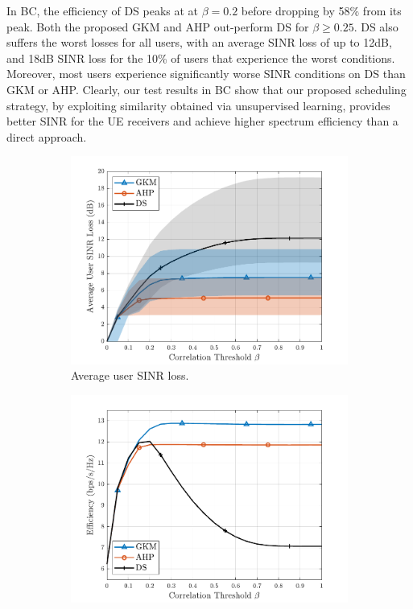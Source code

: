 In BC, the efficiency of DS peaks at at $\beta=0.2$ before dropping by 58\% from its peak.
Both the proposed GKM and AHP out-perform DS for $\beta\geq 0.25$. 
DS also suffers the worst losses for all users, with an average SINR loss of up to 12dB, and 18dB SINR loss for the 10\% of users that experience the worst conditions. Moreover, most users experience significantly worse SINR conditions on DS than GKM or AHP. 
Clearly, our test results in BC show that our proposed scheduling strategy, by exploiting similarity obtained via unsupervised learning, provides better SINR for the UE receivers and achieve higher spectrum efficiency than a direct approach.
\begin{figure}[ht]
	\centering
	\begin{subfigure}{0.48\linewidth}
		\centering
		\includegraphics[width=.95\linewidth]{./figs/usch_figs/BCP_AvgUserSINRLoss_normalizedChannelPwr_M8_N800_nSim10_nChannel100_K04_sigman2_-20.pdf}
		\caption{Average user SINR loss.}\label{usch:fig:BCP_sinrLoss_M8_N800}
	\end{subfigure}
	\begin{subfigure}{0.48\linewidth}
		\centering
		\includegraphics[width=.95\linewidth]{./figs/usch_figs/BCP_NormalizedEfficiency_normalizedChannelPwr_M8_N800_nSim10_nChannel100_K04_sigman2_-20.pdf}

\end{subfigure}
\end{figure}
